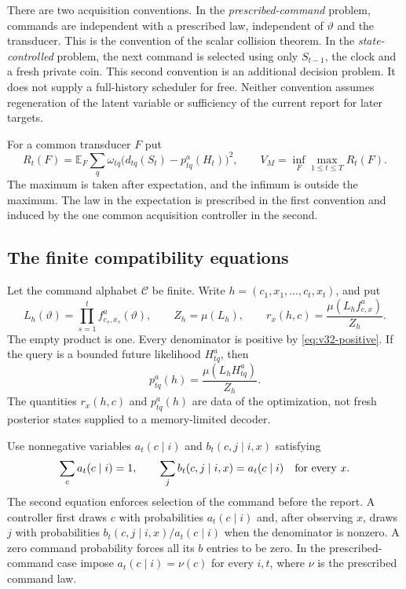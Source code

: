 There are two acquisition conventions. In the \emph{prescribed-command}
problem, commands are independent with a prescribed law, independent of
$\vartheta$ and the transducer. This is the convention of the scalar
collision theorem. In the \emph{state-controlled} problem, the next
command is selected using only $S_{t-1}$, the clock and a fresh private
coin. This second convention is an additional decision problem. It does
not supply a full-history scheduler for free. Neither convention assumes
regeneration of the latent variable or sufficiency of the current report
for later targets.

For a common transducer $F$ put
\begin{equation}\label{eq:v32-risk}
 R_t(F)=\mathbb E_F\sum_q\omega_{tq}
       \bigl(d_{tq}(S_t)-p^a_{tq}(H_t)\bigr)^2,
 \qquad V_M=\inf_F\max_{1\le t\le T}R_t(F).
\end{equation}
The maximum is taken after expectation, and the infimum is outside the
maximum. The law in the expectation is prescribed in the first convention
and induced by the one common acquisition controller in the second.

\subsection{The finite compatibility equations}
Let the command alphabet $\mathcal C$ be finite. Write
$h=(c_1,x_1,\ldots,c_t,x_t)$, and put
\[
 L_h(\vartheta)=\prod_{s=1}^t f^a_{c_s,x_s}(\vartheta),
 \qquad Z_h=\mu(L_h),\qquad
 r_x(h,c)=\frac{\mu(L_h f^a_{c,x})}{Z_h}.
\]
The empty product is one. Every denominator is positive by
\eqref{eq:v32-positive}. If the query is a bounded future likelihood
$H^a_{tq}$, then
\begin{equation}\label{eq:v32-target}
 p^a_{tq}(h)=\frac{\mu(L_h H^a_{tq})}{Z_h}.
\end{equation}
The quantities $r_x(h,c)$ and $p^a_{tq}(h)$ are data of the optimization,
not fresh posterior states supplied to a memory-limited decoder.

Use nonnegative variables $a_t(c\mid i)$ and $b_t(c,j\mid i,x)$ satisfying
\begin{equation}\label{eq:v32-action-rows}
 \sum_c a_t(c\mid i)=1,
 \qquad \sum_j b_t(c,j\mid i,x)=a_t(c\mid i)
       \quad\hbox{for every }x.
\end{equation}
The second equation enforces selection of the command before the report.
A controller first draws $c$ with probabilities $a_t(c\mid i)$ and,
after observing $x$, draws $j$ with probabilities
$b_t(c,j\mid i,x)/a_t(c\mid i)$ when the denominator is nonzero.
A zero command probability forces all its $b$ entries to be zero.
In the prescribed-command case impose $a_t(c\mid i)=\nu(c)$ for every
$i,t$, where $\nu$ is the prescribed command law.

